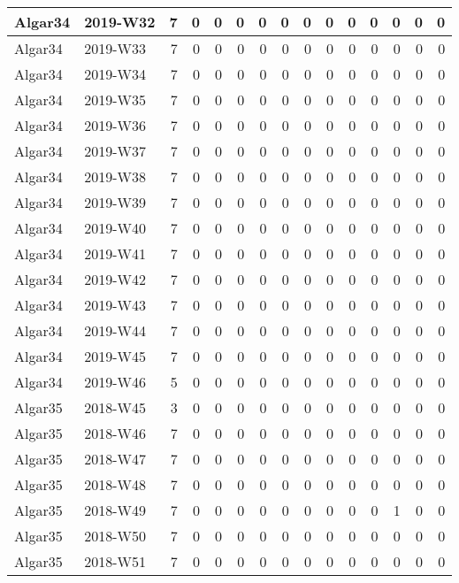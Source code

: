 \documentclass[]{book}
\begin{document}
\begin{table}
\begin{tabular}[t]{l|l|r|r|r|r|r|r|r|r|r|r|r|r|r}
\hline
Algar34 & 2019-W32 & 7 & 0 & 0 & 0 & 0 & 0 & 0 & 0 & 0 & 0 & 0 & 0 & 0\\
\hline
Algar34 & 2019-W33 & 7 & 0 & 0 & 0 & 0 & 0 & 0 & 0 & 0 & 0 & 0 & 0 & 0\\
\hline
Algar34 & 2019-W34 & 7 & 0 & 0 & 0 & 0 & 0 & 0 & 0 & 0 & 0 & 0 & 0 & 0\\
\hline
Algar34 & 2019-W35 & 7 & 0 & 0 & 0 & 0 & 0 & 0 & 0 & 0 & 0 & 0 & 0 & 0\\
\hline
Algar34 & 2019-W36 & 7 & 0 & 0 & 0 & 0 & 0 & 0 & 0 & 0 & 0 & 0 & 0 & 0\\
\hline
Algar34 & 2019-W37 & 7 & 0 & 0 & 0 & 0 & 0 & 0 & 0 & 0 & 0 & 0 & 0 & 0\\
\hline
Algar34 & 2019-W38 & 7 & 0 & 0 & 0 & 0 & 0 & 0 & 0 & 0 & 0 & 0 & 0 & 0\\
\hline
Algar34 & 2019-W39 & 7 & 0 & 0 & 0 & 0 & 0 & 0 & 0 & 0 & 0 & 0 & 0 & 0\\
\hline
Algar34 & 2019-W40 & 7 & 0 & 0 & 0 & 0 & 0 & 0 & 0 & 0 & 0 & 0 & 0 & 0\\
\hline
Algar34 & 2019-W41 & 7 & 0 & 0 & 0 & 0 & 0 & 0 & 0 & 0 & 0 & 0 & 0 & 0\\
\hline
Algar34 & 2019-W42 & 7 & 0 & 0 & 0 & 0 & 0 & 0 & 0 & 0 & 0 & 0 & 0 & 0\\
\hline
Algar34 & 2019-W43 & 7 & 0 & 0 & 0 & 0 & 0 & 0 & 0 & 0 & 0 & 0 & 0 & 0\\
\hline
Algar34 & 2019-W44 & 7 & 0 & 0 & 0 & 0 & 0 & 0 & 0 & 0 & 0 & 0 & 0 & 0\\
\hline
Algar34 & 2019-W45 & 7 & 0 & 0 & 0 & 0 & 0 & 0 & 0 & 0 & 0 & 0 & 0 & 0\\
\hline
Algar34 & 2019-W46 & 5 & 0 & 0 & 0 & 0 & 0 & 0 & 0 & 0 & 0 & 0 & 0 & 0\\
\hline
Algar35 & 2018-W45 & 3 & 0 & 0 & 0 & 0 & 0 & 0 & 0 & 0 & 0 & 0 & 0 & 0\\
\hline
Algar35 & 2018-W46 & 7 & 0 & 0 & 0 & 0 & 0 & 0 & 0 & 0 & 0 & 0 & 0 & 0\\
\hline
Algar35 & 2018-W47 & 7 & 0 & 0 & 0 & 0 & 0 & 0 & 0 & 0 & 0 & 0 & 0 & 0\\
\hline
Algar35 & 2018-W48 & 7 & 0 & 0 & 0 & 0 & 0 & 0 & 0 & 0 & 0 & 0 & 0 & 0\\
\hline
Algar35 & 2018-W49 & 7 & 0 & 0 & 0 & 0 & 0 & 0 & 0 & 0 & 0 & 1 & 0 & 0\\
\hline
Algar35 & 2018-W50 & 7 & 0 & 0 & 0 & 0 & 0 & 0 & 0 & 0 & 0 & 0 & 0 & 0\\
\hline
Algar35 & 2018-W51 & 7 & 0 & 0 & 0 & 0 & 0 & 0 & 0 & 0 & 0 & 0 & 0 & 0\\

\end{tabular}
\end{table}
\end{document}
